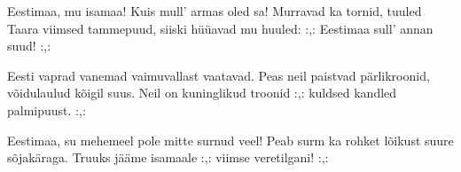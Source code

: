 Eestimaa, mu isamaa!
Kuis mull' armas oled sa!
Murravad ka tornid, tuuled
Taara viimsed tammepuud,
siiski h\"u\"uavad mu huuled:
:,: Eestimaa sull' annan suud! :,:

Eesti vaprad vanemad
vaimuvallast vaatavad.
Peas neil paistvad p\"arlikroonid,
v\~oidulaulud k\~oigil suus.
Neil on kuninglikud troonid
:,: kuldsed kandled palmipuust. :,:

Eestimaa, su mehemeel
pole mitte surnud veel!
Peab surm ka rohket l\~oikust
suure s\~ojak\"araga.
Truuks j\"a\"ame isamaale
:,: viimse veretilgani! :,: